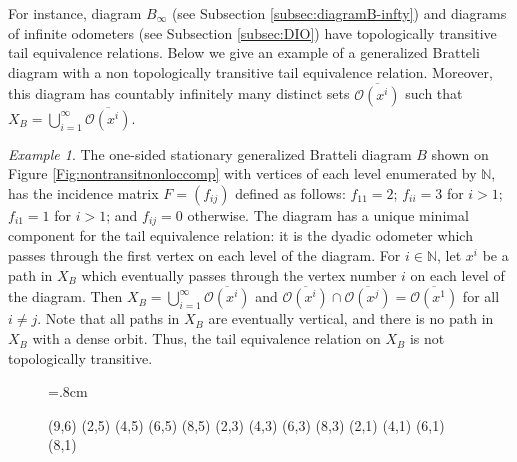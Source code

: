 \documentclass[11pt, twoside]{amsart}
\theoremstyle{definition}
\theoremstyle{remark}
\newtheorem{example}[definition]{Example}
\theoremstyle{plain}
\def\ov{\overline}
\newcommand{\N}{\mathbb N}
\numberwithin{equation}{section}
\begin{document}

For instance, diagram $B_{\infty}$ (see Subsection \ref{subsec:diagramB-infty}) and diagrams of infinite odometers (see Subsection \ref{subsec:DIO}) have topologically transitive tail equivalence relations. Below we give an example of a generalized Bratteli diagram with a non topologically transitive tail equivalence relation. Moreover, this diagram 
has countably infinitely many distinct sets $\ov{\mathcal{O}(x^i)}$ such that $X_B = \bigcup_{i = 1}^{\infty} \ov{\mathcal{O}(x^i)}$.

\begin{example}\label{ex:connected_non-transR}
The one-sided stationary generalized Bratteli diagram $B$ shown on Figure \ref{Fig:nontransitnonloccomp} with vertices of each level enumerated by $\N$, has the incidence matrix $F = (f_{ij})$ defined as follows: $f_{11} = 2$; $f_{ii} = 3$ for $i > 1$; $f_{i1} = 1$ for $i > 1$; and $f_{ij} = 0$ otherwise.
The diagram has a unique minimal component for the tail equivalence relation: it is the dyadic odometer which passes through the first vertex on each level of the diagram. For $i \in \N$, let $x^i$ be a path in $X_B$ which eventually passes through the vertex number $i$ on each level of the diagram. Then $X_B = \bigcup_{i = 1}^{\infty} \ov{\mathcal{O}(x^i)}$ and $\ov{\mathcal{O}(x^i)} \cap \ov{\mathcal{O}(x^j)} = \ov{\mathcal{O}(x^1)}$ for all $i \neq j$. Note that all paths in $X_B$ are eventually vertical, and there is no path in $X_B$ with a dense orbit. Thus, the tail equivalence relation on $X_B$ is not topologically transitive.


\begin{figure}
    \unitlength=.8cm
\begin{graph}(9,6)
 (2,5)
 (4,5)
 (6,5) 
  (8,5)
 (2,3)
 (4,3)
 (6,3)
  (8,3)
 (2,1)
 (4,1)
 (6,1)
  (8,1)


\end{graph}
\end{figure}
\end{example}
\end{document}
